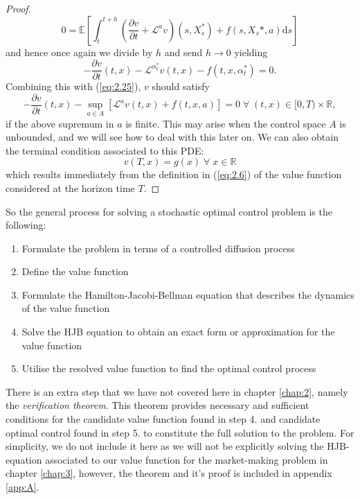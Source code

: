 \begin{proof}
\begin{equation}
        0=\mathbb{E}\left[\int_t^{t+h}\left(\frac{\partial v}{\partial t}+\mathcal{L}^av\right)(s,X_s^*)+f(s,X_s*,a)\mathrm ds\right]
    \end{equation}
    and hence once again we divide by $h$ and send $h\rightarrow0$ yielding
    \begin{equation}
        -\frac{\partial v}{\partial t}(t,x)-\mathcal{L}^{\alpha^*_t}v(t,x)-f(t,x,\alpha_t^*)=0.
    \end{equation}
    Combining this with (\ref{eq:2.25}), $v$ should satisfy
    \begin{equation}
        -\frac{\partial v}{\partial t}(t,x)-\sup_{a\in A}\left[\mathcal{L}^av(t,x)+f(t,x,a)\right]=0\;\forall\;(t,x)\in[0,T)\times\mathbb{R},
    \end{equation}
    if the above supremum in $a$ is finite. This may arise when the control space $A$
    is unbounded, and we will see how to deal with this later on. We can also obtain
    the terminal condition associated to this PDE:
    \begin{equation}
        v(T,x)=g(x)\;\forall\;x\in\mathbb{R}
    \end{equation}
    which results immediately from the definition in (\ref{eq:2.6}) of the value function
    considered at the horizon time $T$.
\end{proof}

So the general process for solving a stochastic optimal control problem is the 
following:
\begin{enumerate}
    \item Formulate the problem in terms of a controlled diffusion process
    \item Define the value function 
    \item Formulate the Hamilton-Jacobi-Bellman equation that describes the dynamics 
    of the value function
    \item Solve the HJB equation to obtain an exact form or approximation for the 
    value function
    \item Utilise the resolved value function to find the optimal control process
\end{enumerate}

There is an extra step that we have not covered here in chapter \ref{chap:2},
namely the \emph{verification theorem}. This theorem provides necessary and sufficient 
conditions for the candidate value function found in step 4. and candidate optimal 
control found in step 5. to constitute the full solution to the problem. For simplicity,
we do not include it here as we will not be explicitly solving the HJB-equation associated 
to our value function for the market-making problem in chapter \ref{chap:3}, however,
the theorem and it's proof is included in appendix \ref{app:A}.

